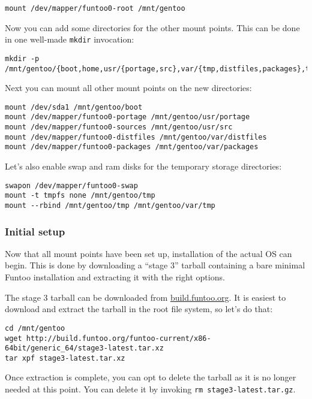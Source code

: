 \begin{verbatim}
mount /dev/mapper/funtoo0-root /mnt/gentoo
\end{verbatim}

Now you can add some directories for the other mount points. This can be
done in one well-made \texttt{mkdir} invocation:

\begin{verbatim}
mkdir -p /mnt/gentoo/{boot,home,usr/{portage,src},var/{tmp,distfiles,packages},tmp}
\end{verbatim}

Next you can mount all other mount points on the new directories:

\begin{verbatim}
mount /dev/sda1 /mnt/gentoo/boot
mount /dev/mapper/funtoo0-portage /mnt/gentoo/usr/portage
mount /dev/mapper/funtoo0-sources /mnt/gentoo/usr/src
mount /dev/mapper/funtoo0-distfiles /mnt/gentoo/var/distfiles
mount /dev/mapper/funtoo0-packages /mnt/gentoo/var/packages
\end{verbatim}

Let's also enable swap and ram disks for the temporary storage
directories:

\begin{verbatim}
swapon /dev/mapper/funtoo0-swap
mount -t tmpfs none /mnt/gentoo/tmp
mount --rbind /mnt/gentoo/tmp /mnt/gentoo/var/tmp
\end{verbatim}

\subsubsection{Initial setup}\label{initial-setup}

Now that all mount points have been set up, installation of the actual
OS can begin. This is done by downloading a ``stage 3'' tarball
containing a bare minimal Funtoo installation and extracting it with the
right options.

The stage 3 tarball can be downloaded from
\href{http://build.funtoo.org/}{build.funtoo.org}. It is easiest to
download and extract the tarball in the root file system, so let's do
that:

\begin{verbatim}
cd /mnt/gentoo
wget http://build.funtoo.org/funtoo-current/x86-64bit/generic_64/stage3-latest.tar.xz
tar xpf stage3-latest.tar.xz
\end{verbatim}

Once extraction is complete, you can opt to delete the tarball as it is
no longer needed at this point. You can delete it by invoking
\texttt{rm\ stage3-latest.tar.gz}.

